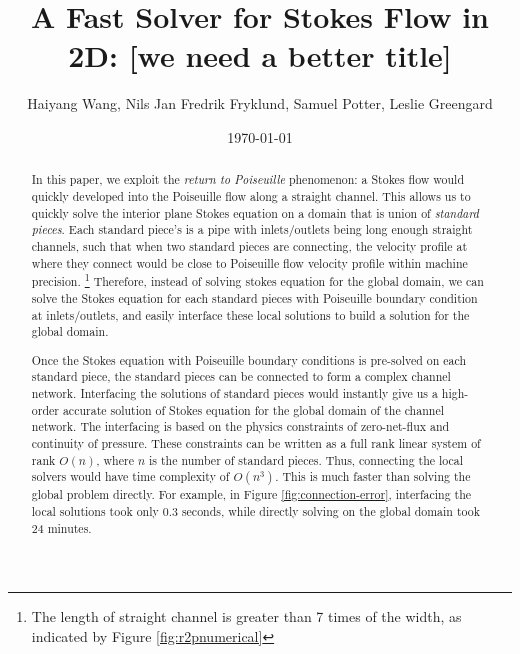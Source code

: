\documentclass[10pt,twocolumn]{article}
\author{Haiyang Wang, Nils Jan Fredrik Fryklund, Samuel Potter, Leslie Greengard}
\date{\today}
\title{A Fast Solver for Stokes Flow in 2D: [we need a better title]}
\begin{document}
\maketitle

\begin{abstract}
  In this paper, we exploit the \textit{return to Poiseuille} phenomenon: 
  a Stokes flow would quickly developed into the Poiseuille flow along a straight channel. 
  This allows us to quickly solve the interior plane Stokes equation 
  on a domain that is union of \textit{standard pieces}. 
  Each standard piece's is a pipe with inlets/outlets 
  being long enough straight channels, such that when two standard pieces are connecting, 
  the velocity profile at where they connect would be close to Poiseuille flow velocity profile 
  within machine precision. 
  \footnote{The length of straight channel is greater than 7 times of the width, 
  as indicated by Figure \ref{fig:r2pnumerical} }
  Therefore, instead of solving stokes equation for the global domain, 
  we can solve the Stokes equation 
  for each standard pieces with Poiseuille 
  boundary condition at inlets/outlets, 
  and easily interface these local solutions 
  to build a solution for the global domain. 
  
  Once the Stokes equation with Poiseuille boundary conditions is pre-solved on each standard piece, 
  the standard pieces can be connected to form a complex channel network. 
  Interfacing the solutions of standard pieces
  would instantly give us a high-order accurate solution of Stokes equation 
  for the global domain of the channel network. 
  The interfacing is based on 
  the physics constraints of  zero-net-flux and continuity of pressure. 
  These constraints can be written as a full rank linear system of rank $O(n)$,
  where $n$ is the number of standard pieces. Thus, connecting the local solvers 
  would have time complexity of $O(n^3)$. 
  This is much faster than solving the global problem directly. 
  For example, in Figure \ref{fig:connection-error}, interfacing the local solutions took only 0.3 seconds, while directly
  solving on the global domain took 24 minutes. 
\end{abstract}
\end{document}
